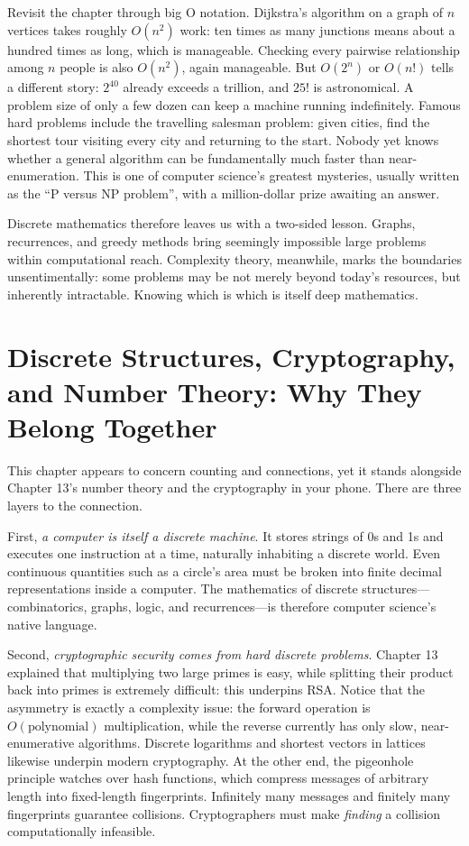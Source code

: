 Revisit the chapter through big O notation. Dijkstra's algorithm on a graph of $n$ vertices takes roughly $O(n^2)$ work: ten times as many junctions means about a hundred times as long, which is manageable. Checking every pairwise relationship among $n$ people is also $O(n^2)$, again manageable. But $O(2^n)$ or $O(n!)$ tells a different story: $2^{40}$ already exceeds a trillion, and $25!$ is astronomical. A problem size of only a few dozen can keep a machine running indefinitely. Famous hard problems include the travelling salesman problem: given cities, find the shortest tour visiting every city and returning to the start. Nobody yet knows whether a general algorithm can be fundamentally much faster than near-enumeration. This is one of computer science's greatest mysteries, usually written as the ``P versus NP problem'', with a million-dollar prize awaiting an answer.

Discrete mathematics therefore leaves us with a two-sided lesson. Graphs, recurrences, and greedy methods bring seemingly impossible large problems within computational reach. Complexity theory, meanwhile, marks the boundaries unsentimentally: some problems may be not merely beyond today's resources, but inherently intractable. Knowing which is which is itself deep mathematics.

\section{Discrete Structures, Cryptography, and Number Theory: Why They Belong Together}

This chapter appears to concern counting and connections, yet it stands alongside Chapter 13's number theory and the cryptography in your phone. There are three layers to the connection.

First, \emph{a computer is itself a discrete machine}. It stores strings of 0s and 1s and executes one instruction at a time, naturally inhabiting a discrete world. Even continuous quantities such as a circle's area must be broken into finite decimal representations inside a computer. The mathematics of discrete structures---combinatorics, graphs, logic, and recurrences---is therefore computer science's native language.

Second, \emph{cryptographic security comes from hard discrete problems}. Chapter 13 explained that multiplying two large primes is easy, while splitting their product back into primes is extremely difficult: this underpins RSA. Notice that the asymmetry is exactly a complexity issue: the forward operation is $O(\text{polynomial})$ multiplication, while the reverse currently has only slow, near-enumerative algorithms. Discrete logarithms and shortest vectors in lattices likewise underpin modern cryptography. At the other end, the pigeonhole principle watches over hash functions, which compress messages of arbitrary length into fixed-length fingerprints. Infinitely many messages and finitely many fingerprints guarantee collisions. Cryptographers must make \emph{finding} a collision computationally infeasible.

